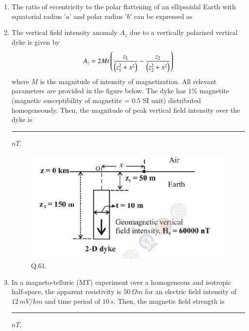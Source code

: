 \documentclass[journal,12pt,onecolumn]{IEEEtran}
\theoremstyle{remark}
\begin{document}
\begin{enumerate}
    \item The ratio of eccentricity to the polar flattening of an ellipsoidal Earth with equatorial radius '$a$' and polar radius '$b$' can be expressed as \hfill{}
        \begin{enumerate} 
        \end{enumerate}
    
    \item The vertical field intensity anomaly $A_z$ due to a vertically polarized vertical dyke is given by $$ A_z = 2Mt\left(\frac{z_1}{\left(z_1^2+x^2\right)} - \frac{z_2}{\left(z_2^2+x^2\right)}\right)$$ where $M$ is the magnitude of intensity of magnetization. All relevant parameters are provided in the figure below. The dyke has $1\%$ magnetite (magnetic susceptibility of magnetite = $0.5$ SI unit) distributed homogeneously. Then, the magnitude of peak vertical field intensity over the dyke is \rule{3cm}{0.15mm} $nT$.  \hfill{}
    
    \begin{figure}[H]
        \centering
        \includegraphics[width=0.5\columnwidth]{Figs/fig_10.png}
        \caption{Q.61.}
        \label{fig:placeholder_10}
    \end{figure}
    
    \item In a magneto-telluric (MT) experiment over a homogeneous and isotropic half-space, the apparent resistivity is $50\,\Omega m$ for an electric field intensity of $12\,mV/km$ and time period of $10\,s$. Then, the magnetic field strength is \rule{3cm}{0.15mm} $nT$. \hfill{}
    

\end{enumerate}
\end{document}
